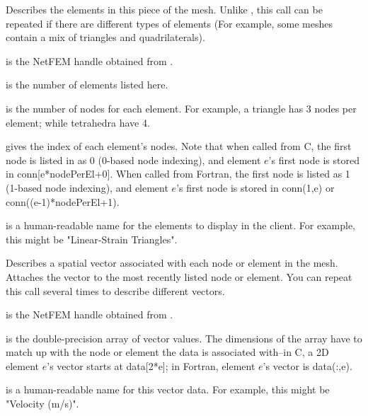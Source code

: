 \documentclass[10pt]{article}
\begin{document}
Describes the elements in this piece of the mesh.
Unlike , this call can be repeated
if there are different types of elements (For example, 
some meshes contain a mix of triangles and quadrilaterals).

 is the NetFEM handle obtained from .

 is the number of elements listed here.

 is the number of nodes for each element.
For example, a triangle has 3 nodes per element; while 
tetrahedra have 4.

 gives the index of each element's nodes.  Note
that when called from C, the first node is listed in 
 as 0 (0-based node indexing), and element $e$'s
first node is stored in conn[e*nodePerEl+0].
When called from Fortran, the first node is listed as 1 
(1-based node indexing), and element $e$'s first node is
stored in conn(1,e) or conn((e-1)*nodePerEl+1).

 is a human-readable name for the elements
to display in the client.  For example, this might be
"Linear-Strain Triangles".




Describes a spatial vector associated with each node or element
in the mesh.  Attaches the vector to the most recently listed 
node or element.  You can repeat this call several times to 
describe different vectors.

 is the NetFEM handle obtained from .

 is the double-precision array of vector values.
The dimensions of the array have to match up with the node
or element the data is associated with--in C, a 2D element $e$'s
vector starts at data[2*e]; in Fortran, element $e$'s 
vector is data(:,e).

 is a human-readable name for this vector data.
For example, this might be "Velocity (m/s)".


\end{document}
